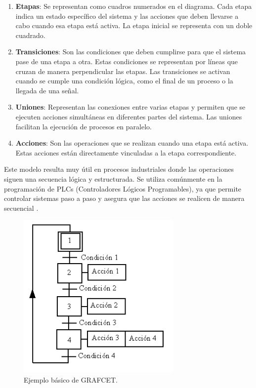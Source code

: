 \begin{enumerate}
    \item \textbf{Etapas}: Se representan como cuadros numerados en el diagrama. Cada etapa indica un estado específico del sistema y las acciones que deben llevarse a cabo cuando esa etapa está activa. La etapa inicial se representa con un doble cuadrado.
    \item \textbf{Transiciones}: Son las condiciones que deben cumplirse para que el sistema pase de una etapa a otra. Estas condiciones se representan por líneas que cruzan de manera perpendicular las etapas. Las transiciones se activan cuando se cumple una condición lógica, como el final de un proceso o la llegada de una señal.
    \item \textbf{Uniones}: Representan las conexiones entre varias etapas y permiten que se ejecuten acciones simultáneas en diferentes partes del sistema. Las uniones facilitan la ejecución de procesos en paralelo.
    \item \textbf{Acciones}: Son las operaciones que se realizan cuando una etapa está activa. Estas acciones están directamente vinculadas a la etapa correspondiente.
\end{enumerate}
    
Este modelo resulta muy útil en procesos industriales donde las operaciones siguen una secuencia lógica y estructurada. Se utiliza comúnmente en la programación de PLCs (Controladores Lógicos Programables), ya que permite controlar sistemas paso a paso y asegura que las acciones se realicen de manera secuencial \cite{grafcet_info}.

\begin{figure} [h!]
  \begin{center}
    \includegraphics[width=8cm]{figs/grafcet_def}
  \end{center}
  \caption{\centering Ejemplo básico de GRAFCET.}
  \label{fig:grafcet_def}
\end{figure} 

